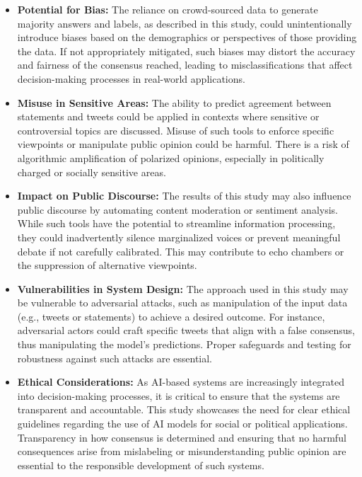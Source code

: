 \documentclass[14]{article}
\begin{document}
\begin{itemize}
    \item \textbf{Potential for Bias:} The reliance on crowd-sourced data to generate majority answers and labels, as described in this study, could unintentionally introduce biases based on the demographics or perspectives of those providing the data. If not appropriately mitigated, such biases may distort the accuracy and fairness of the consensus reached, leading to misclassifications that affect decision-making processes in real-world applications.
    
    \item \textbf{Misuse in Sensitive Areas:} The ability to predict agreement between statements and tweets could be applied in contexts where sensitive or controversial topics are discussed. Misuse of such tools to enforce specific viewpoints or manipulate public opinion could be harmful. There is a risk of algorithmic amplification of polarized opinions, especially in politically charged or socially sensitive areas.
    
    \item \textbf{Impact on Public Discourse:} The results of this study may also influence public discourse by automating content moderation or sentiment analysis. While such tools have the potential to streamline information processing, they could inadvertently silence marginalized voices or prevent meaningful debate if not carefully calibrated. This may contribute to echo chambers or the suppression of alternative viewpoints.
    
    \item \textbf{Vulnerabilities in System Design:} The approach used in this study may be vulnerable to adversarial attacks, such as manipulation of the input data (e.g., tweets or statements) to achieve a desired outcome. For instance, adversarial actors could craft specific tweets that align with a false consensus, thus manipulating the model’s predictions. Proper safeguards and testing for robustness against such attacks are essential.
    
    \item \textbf{Ethical Considerations:} As AI-based systems are increasingly integrated into decision-making processes, it is critical to ensure that the systems are transparent and accountable. This study showcases the need for clear ethical guidelines regarding the use of AI models for social or political applications. Transparency in how consensus is determined and ensuring that no harmful consequences arise from mislabeling or misunderstanding public opinion are essential to the responsible development of such systems.
\end{itemize}
\end{document}
